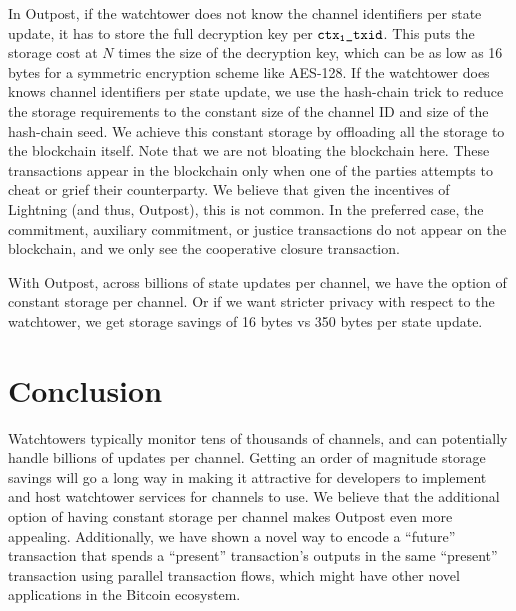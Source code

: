 In Outpost, if the watchtower does not know the channel identifiers per state update, it has to store the full decryption key per $\texttt{ctx\textsubscript{1}\_txid}$. This puts the storage cost at $N$ times the size of the decryption key, which can be as low as 16 bytes for a symmetric encryption scheme like AES-128. If the watchtower does knows channel identifiers per state update, we use the hash-chain trick to reduce the storage requirements to the constant size of the channel ID and size of the hash-chain seed. We achieve this constant storage by offloading all the storage to the blockchain itself. Note that we are not bloating the blockchain here. These transactions appear in the blockchain only when one of the parties attempts to cheat or grief their counterparty. We believe that given the incentives of Lightning (and thus, Outpost), this is not common. In the preferred case, the commitment, auxiliary commitment, or justice transactions do not appear on the blockchain, and we only see the cooperative closure transaction.

With Outpost, across billions of state updates per channel, we have the option of constant storage per channel. Or if we want stricter privacy with respect to the watchtower, we get storage savings of 16 bytes vs 350 bytes per state update.

\section{Conclusion}
Watchtowers typically monitor tens of thousands of channels, and can potentially handle billions of updates per channel. Getting an order of magnitude storage savings will go a long way in making it attractive for developers to implement and host watchtower services for channels to use. We believe that the additional option of having constant storage per channel makes Outpost even more appealing. Additionally, we have shown a novel way to encode a ``future'' transaction that spends a ``present'' transaction's outputs in the same ``present'' transaction using parallel transaction flows, which might have other novel applications in the Bitcoin ecosystem. 